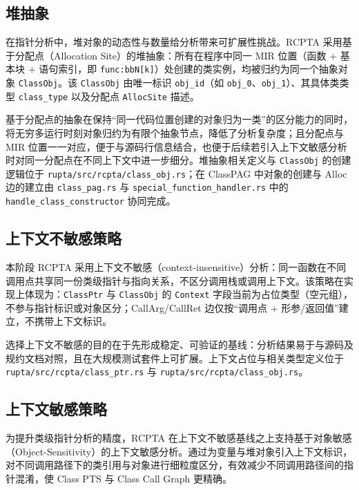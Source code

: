 \subsection{堆抽象}
\label{subsec:heap}

在指针分析中，堆对象的动态性与数量给分析带来可扩展性挑战。RCPTA 采用基于分配点（Allocation Site）的堆抽象：所有在程序中同一 MIR 位置（函数 + 基本块 + 语句索引，即 \texttt{func:bbN[k]}）处创建的类实例，均被归约为同一个抽象对象 \texttt{ClassObj}。该 \texttt{ClassObj} 由唯一标识 \texttt{obj\_id}（如 \texttt{obj\_0}、\texttt{obj\_1}）、其具体类类型 \texttt{class\_type} 以及分配点 \texttt{AllocSite} 描述。

基于分配点的抽象在保持“同一代码位置创建的对象归为一类”的区分能力的同时，将无穷多运行时刻对象归约为有限个抽象节点，降低了分析复杂度；且分配点与 MIR 位置一一对应，便于与源码行信息结合，也便于后续若引入上下文敏感分析时对同一分配点在不同上下文中进一步细分。堆抽象相关定义与 \texttt{ClassObj} 的创建逻辑位于 \texttt{rupta/src/rcpta/class\_obj.rs}；在 ClassPAG 中对象的创建与 Alloc 边的建立由 \texttt{class\_pag.rs} 与 \texttt{special\_function\_handler.rs} 中的 \texttt{handle\_class\_constructor} 协同完成。

\subsection{上下文不敏感策略}

本阶段 RCPTA 采用上下文不敏感（context-insensitive）分析：同一函数在不同调用点共享同一份类级指针与指向关系，不区分调用栈或调用上下文。该策略在实现上体现为：\texttt{ClassPtr} 与 \texttt{ClassObj} 的 \texttt{Context} 字段当前为占位类型（空元组），不参与指针标识或对象区分；CallArg/CallRet 边仅按“调用点 + 形参/返回值”建立，不携带上下文标识。

选择上下文不敏感的目的在于先形成稳定、可验证的基线：分析结果易于与源码及规约文档对照，且在大规模测试套件上可扩展。上下文占位与相关类型定义位于 \texttt{rupta/src/rcpta/class\_ptr.rs} 与 \texttt{rupta/src/rcpta/class\_obj.rs}。

\subsection{上下文敏感策略}

为提升类级指针分析的精度，RCPTA 在上下文不敏感基线之上支持基于对象敏感（Object-Sensitivity）的上下文敏感分析。通过为变量与堆对象引入上下文标识，对不同调用路径下的类引用与对象进行细粒度区分，有效减少不同调用路径间的指针混淆，使 Class PTS 与 Class Call Graph 更精确。

